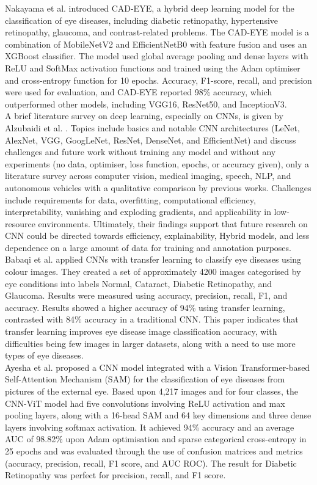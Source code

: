 \documentclass[conference,9pt]{IEEEtran}
\begin{document}
Nakayama et al. \cite{8} introduced CAD-EYE, a hybrid deep learning model for the classification of eye diseases, including diabetic retinopathy, hypertensive retinopathy, glaucoma, and contrast-related problems. The CAD-EYE model is a combination of MobileNetV2 and EfficientNetB0 with feature fusion and uses an XGBoost classifier. The model used global average pooling and dense layers with ReLU and SoftMax activation functions and trained using the Adam optimiser and cross-entropy function for 10 epochs. Accuracy, F1-score, recall, and precision were used for evaluation, and CAD-EYE reported 98\% accuracy, which outperformed other models, including VGG16, ResNet50, and InceptionV3.\\

A brief literature survey on deep learning, especially on CNNs, is given by Alzubaidi et al. \cite{9}. Topics include basics and notable CNN architectures (LeNet, AlexNet, VGG, GoogLeNet, ResNet, DenseNet, and EfficientNet) and discuss challenges and future work without training any model and without any experiments (no data, optimiser, loss function, epochs, or accuracy given), only a literature survey across computer vision, medical imaging, speech, NLP, and autonomous vehicles with a qualitative comparison by previous works. Challenges include requirements for data, overfitting, computational efficiency, interpretability, vanishing and exploding gradients, and applicability in low-resource environments. Ultimately, their findings support that future research on CNN could be directed towards efficiency, explainability, Hybrid models, and less dependence on a large amount of data for training and annotation purposes.\\

Babaqi et al.\cite{13} applied CNNs with transfer learning to classify eye diseases using colour images. They created a set of approximately 4200 images categorised by eye conditions into labels Normal, Cataract, Diabetic Retinopathy, and Glaucoma. Results were measured using accuracy, precision, recall, F1, and accuracy. Results showed a higher accuracy of 94\% using transfer learning, contrasted with 84\% accuracy in a traditional CNN. This paper indicates that transfer learning improves eye disease image classification accuracy, with difficulties being few images in larger datasets, along with a need to use more types of eye diseases.\\

Ayesha et al. \cite{14} proposed a CNN model integrated with a Vision Transformer-based Self-Attention Mechanism (SAM) for the classification of eye diseases from pictures of the external eye. Based upon 4,217 images and for four classes, the CNN-ViT model had five convolutions involving ReLU activation and max pooling layers, along with a 16-head SAM and 64 key dimensions and three dense layers involving softmax activation. It achieved 94\% accuracy and an average AUC of 98.82\% upon Adam optimisation and sparse categorical cross-entropy in 25 epochs and was evaluated through the use of confusion matrices and metrics (accuracy, precision, recall, F1 score, and AUC ROC). The result for Diabetic Retinopathy was perfect for precision, recall, and F1 score.\\
\end{document}
